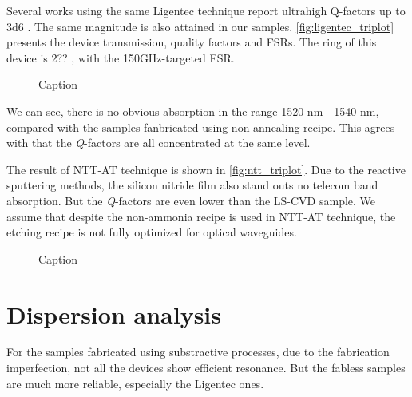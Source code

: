Several works using the same Ligentec technique report ultrahigh Q-factors up to \num{3d6} \cites{Yu2019, Vaidya2019}. The same magnitude is also attained in our samples. \autoref{fig:ligentec_triplot} presents the device transmission, quality factors and FSRs. The ring of this device is 2?? \um, with the 150GHz-targeted FSR. 

\begin{figure}
    \centering
    
    \caption{Caption}
    \label{fig:ligentec_triplot}
\end{figure}

We can see, there is no obvious absorption in the range 1520 nm - 1540 nm, compared with the samples fanbricated using non-annealing recipe. This agrees with that the \textit{Q}-factors are all concentrated at the same level. 

The result of NTT-AT technique is shown in \autoref{fig:ntt_triplot}. Due to the reactive sputtering methods, the silicon nitride film also stand outs no telecom band absorption. But the \textit{Q}-factors are even lower than the LS-CVD sample. We assume that despite the non-ammonia recipe is used in NTT-AT technique, the etching recipe is not fully optimized for optical waveguides.

\begin{figure}
    \centering
    
    \caption{Caption}
    \label{fig:ntt_triplot}
\end{figure}


\section{Dispersion analysis}

For the samples fabricated using substractive processes, due to the fabrication imperfection, not all the devices show efficient resonance. But the fabless samples are much more reliable, especially the Ligentec ones.


